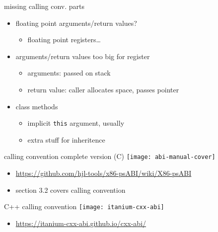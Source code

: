 \begin{frame}{missing calling conv. parts}
    \begin{itemize}
    \item floating point arguments/return values?
        \begin{itemize}
        \item floating point registers\ldots
        \end{itemize}
    \item arguments/return values too big for register
        \begin{itemize}
            \item arguments: passed on stack
            \item return value: caller allocates space, passes pointer
        \end{itemize}
    \item class methods
        \begin{itemize}
        \item implicit \texttt{this} argument, usually
        \item extra stuff for inheritence
        \end{itemize}
    \end{itemize}
\end{frame}

\begin{frame}{calling convention complete version (C)}
    \texttt{[image: abi-manual-cover]}
    \begin{itemize}
    \item \url{https://github.com/hjl-tools/x86-psABI/wiki/X86-psABI}
    \item section 3.2 covers calling convention
    \end{itemize}
\end{frame}

\begin{frame}{C++ calling convention}
    \texttt{[image: itanium-cxx-abi]}
    \begin{itemize}
        \item \url{https://itanium-cxx-abi.github.io/cxx-abi/}
    \end{itemize}
\end{frame}
